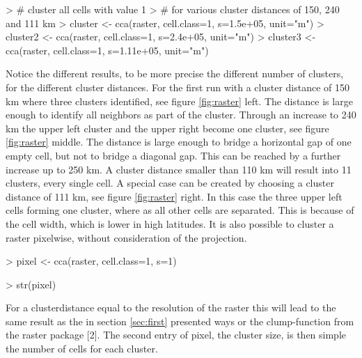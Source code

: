 \documentclass[10pt,a4paper]{article}
\begin{document}
\begin{Schunk}
\begin{Sinput}
> # cluster all cells with value 1
> # for various cluster distances of 150, 240 and 111 km
> cluster <- cca(raster, cell.class=1, s=1.5e+05, unit="m")
> cluster2 <- cca(raster, cell.class=1, s=2.4e+05, unit="m")
> cluster3 <- cca(raster, cell.class=1, s=1.11e+05, unit="m")
\end{Sinput}
\end{Schunk}


Notice the different results, to be more precise the different number of clusters, for the different cluster distances. For the first run with a cluster distance of 150 km where three clusters identified, see figure \ref{fig:raster} left. The distance is large enough to identify all neighbors as part of the cluster. Through an increase to 240 km the upper left cluster and the upper right become one cluster, see figure \ref{fig:raster} middle. The distance is large enough to bridge a horizontal gap of one empty cell, but not to bridge a diagonal gap. This can be reached by a further increase up to 250 km.
A cluster distance smaller than 110 km will result into 11 clusters, every single cell. A special case can be created by choosing a cluster distance of 111 km, see figure \ref{fig:raster} right. In this case the three upper left cells forming one cluster, where as all other cells are separated. This is because of the cell width, which is lower in high latitudes.
It is also possible to cluster a raster pixelwise, without consideration of the projection.
\begin{Schunk}
\begin{Sinput}
> pixel <- cca(raster, cell.class=1, s=1)
\end{Sinput}
\end{Schunk}
\begin{Schunk}
\begin{Sinput}
> str(pixel)
\end{Sinput}
\end{Schunk}
For a clusterdistance equal to the resolution of the raster this will lead to the same result as the in section \ref{sec:first} presented ways or the clump-function from the raster package [2]. The second entry of pixel, the cluster size, is then simple the number of cells for each cluster.
\end{document}

